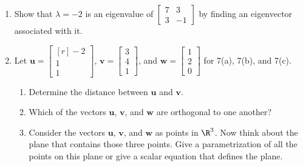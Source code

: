 \documentclass[basic]{inVerba-notes}
\begin{document}
\begin{enumerate}[align=left, leftmargin=0pt, labelindent=\parindent, listparindent=\parindent, labelwidth=0pt, itemindent=!]
  \item {} Show that \(\lambda=-2\) is an eigenvalue of \(\begin{bmatrix}7 & 3\\3 & -1\end{bmatrix}\) by finding an eigenvector associated with it.
  \basec{\[%
  \operatorname{N}\left(\begin{bmatrix} %
    7 \chap{-2} & 3 \\
    3 & -1 - \chap{-2} 
    \end{bmatrix}\right) = \str{\begin{bmatrix} -\tfrac{1}{3} \\ 1 \end{bmatrix}}
  \]}%
  
  
  \newpage

  \item {} Let \(\bm{u}=\begin{bmatrix*}[r] -2 \\ 1 \\ 1 \end{bmatrix*}\),  \(\bm{v}=\begin{bmatrix} 3 \\ 4 \\ 1 \end{bmatrix}\), and \(\bm{w}=\begin{bmatrix} 1 \\ 2\\ 0 \end{bmatrix}\) for 7(a), 7(b), and 7(c).
  
    \begin{enumerate}
      \item {} Determine the distance between \(\bm{u}\) and \(\bm{v}\).
      \item {} Which of the vectors \(\bm{u}\), \(\bm{v}\), and \(\bm{w}\) are orthogonal to one another?
      \item {} Consider the vectors \(\bm{u}\), \(\bm{v}\), and \(\bm{w}\) as points in \(\R^3\). Now think about the plane that contains those three points. Give a parametrization of all the points on this plane or give a scalar equation that defines the plane.
      

\end{enumerate}
\end{enumerate}
\end{document}

